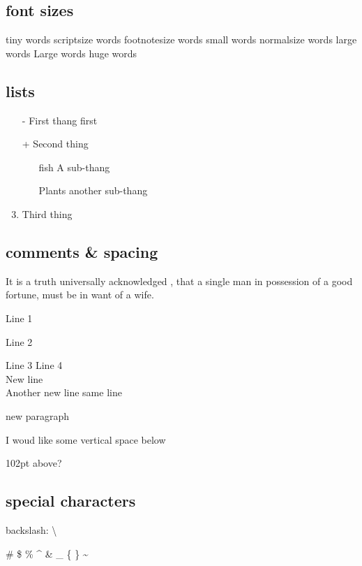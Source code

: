 \documentclass[a4paper,12pt]{article}
\begin{document}
\subsection{font sizes}
{\tiny tiny words}
{\scriptsize scriptsize words}
{\footnotesize footnotesize words}
{\small small words}
{\normalsize normalsize words}
{\large large words}
{\Large Large words}
{\huge huge words}

\subsection{lists}
\begin{enumerate}
\item[-] First thang first
\item[+] Second thing
\begin{itemize}
\item[fish] A sub-thang
\item[Plants] another sub-thang
\end{itemize}
\item Third thing
\end{enumerate}

\subsection{comments \& spacing}
It is a truth universally acknowledged %
, that a single man in possession of a good fortune, must be in want of a wife.

Line 1


Line 2






Line 3
Line 4
\\

New line
\\

Another new line
same line

new paragraph

I woud like some vertical space below \vspace{102pt}

102pt above?

\subsection{special characters}

backslash: \textbackslash

\# \$ \% \^{} \& \_ \{ \} \~{}
\end{document}
